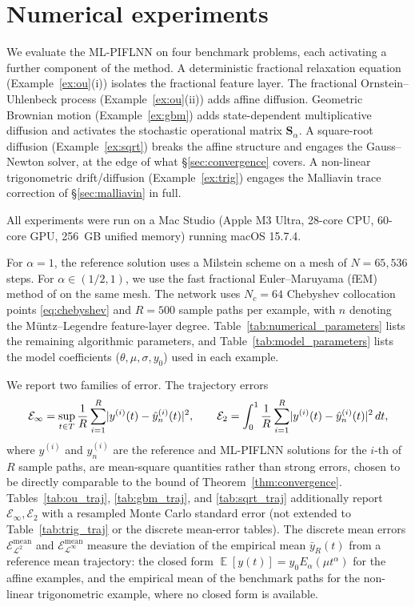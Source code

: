 \documentclass[11pt, a4paper]{article}
\theoremstyle{theoremstyle}
\theoremstyle{definitionstyle}
\newcommand{\dd}{\mathop{}\!d}
\DeclareMathOperator{\EE}{\mathbb E}
\DeclarePairedDelimiter{\abs}{\lvert}{\rvert}
\begin{document}
\section{Numerical experiments}\label{sec:numerics}
We evaluate the ML-PIFLNN on four benchmark problems, each activating a further component of the method. A deterministic fractional relaxation equation (Example~\ref{ex:ou}(i)) isolates the fractional feature layer. The fractional Ornstein--Uhlenbeck process (Example~\ref{ex:ou}(ii)) adds affine diffusion. Geometric Brownian motion (Example~\ref{ex:gbm}) adds state-dependent multiplicative diffusion and activates the stochastic operational matrix $\mathbf S_\alpha$. A square-root diffusion (Example~\ref{ex:sqrt}) breaks the affine structure and engages the Gauss--Newton solver, at the edge of what \S\ref{sec:convergence} covers. A non-linear trigonometric drift/diffusion (Example~\ref{ex:trig}) engages the Malliavin trace correction of \S\ref{sec:malliavin} in full.

All experiments were run on a Mac Studio (Apple M3 Ultra, 28-core CPU, 60-core GPU, 256~GB unified memory) running macOS 15.7.4.

For $\alpha = 1$, the reference solution uses a Milstein scheme on a mesh of $N = 65{,}536$ steps. For $\alpha \in (1/2, 1)$, we use the fast fractional Euler--Maruyama (fEM) method of \cite{zhang2023fast} on the same mesh. The network uses $N_c = 64$ Chebyshev collocation points \eqref{eq:chebyshev} and $R = 500$ sample paths per example, with $n$ denoting the M\"untz--Legendre feature-layer degree. Table~\ref{tab:numerical_parameters} lists the remaining algorithmic parameters, and Table~\ref{tab:model_parameters} lists the model coefficients ($\theta, \mu, \sigma, y_0$) used in each example.

We report two families of error. The trajectory errors
\begin{equation}\label{eq:strong_errors}
    \mathcal E_\infty = \sup_{t \in T} \frac 1R \sum_{i=1}^R \abs{y^{(i)}(t) - \hat y_n^{(i)}(t)}^2, \qquad
    \mathcal E_2 = \int_0^1 \frac 1R \sum_{i=1}^R \abs{y^{(i)}(t) - \hat y_n^{(i)}(t)}^2 \dd{t},
\end{equation}
where $y^{(i)}$ and $\hat y_n^{(i)}$ are the reference and ML-PIFLNN solutions for the $i$-th of $R$ sample paths, are mean-square quantities rather than strong errors, chosen to be directly comparable to the bound of Theorem~\ref{thm:convergence}. Tables~\ref{tab:ou_traj}, \ref{tab:gbm_traj}, and \ref{tab:sqrt_traj} additionally report $\mathcal E_\infty,\mathcal E_2$ with a resampled Monte Carlo standard error (not extended to Table~\ref{tab:trig_traj} or the discrete mean-error tables). The discrete mean errors $\mathcal E_{\mathcal L^2}^{\mathrm{mean}}$ and $\mathcal E_{\mathcal L^\infty}^{\mathrm{mean}}$ measure the deviation of the empirical mean $\bar y_R(t)$ from a reference mean trajectory: the closed form $\EE[y(t)] = y_0 E_\alpha(\mu t^\alpha)$ for the affine examples, and the empirical mean of the benchmark paths for the non-linear trigonometric example, where no closed form is available.
\end{document}
